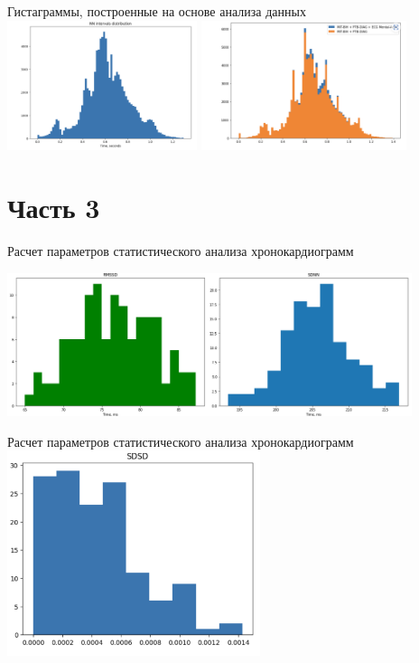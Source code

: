 \documentclass[xcolor=table]{beamer}
\begin{document}
\begin{frame}{Гистаграммы, построенные на основе анализа данных}
\includegraphics[height=3.8cm]{Распределение1.png}
\includegraphics[height=3.8cm]{Распределение2.png}
\end{frame}




\section{Часть 3}
\begin{frame}{Расчет параметров статистического анализа хронокардиограмм}

\centering
\includegraphics[height=4.2cm]{graph2.png}

\end{frame}


\begin{frame}{Расчет параметров статистического анализа хронокардиограмм}
\centering
\includegraphics[height=6cm]{SDSD.png}

\end{frame}
\end{document}
